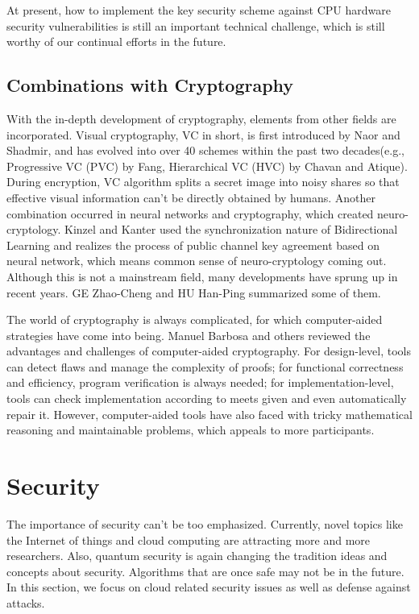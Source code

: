 \documentclass[conference]{IEEEtran}
\begin{document}
At present, how to implement the key security scheme against CPU hardware security vulnerabilities is still an important technical challenge, which is still worthy of our continual efforts in the future.

\subsection{Combinations with Cryptography}
\par With the in-depth development of cryptography, elements from other fields are incorporated. Visual cryptography, VC in short, is first introduced by Naor and Shadmir\cite{wxr-1}, and has evolved into over 40 schemes within the past two decades(e.g., Progressive VC (PVC) by Fang\cite{wxr-2}, Hierarchical VC (HVC) by Chavan and Atique\cite{wxr-3}). During encryption, VC algorithm splits a secret image into noisy shares so that effective visual information can’t be directly obtained by humans. Another combination occurred in neural networks and cryptography, which created neuro-cryptology. Kinzel and Kanter\cite{wxr-4} used the synchronization nature of Bidirectional Learning and realizes the process of public channel key agreement based on neural network, which means common sense of neuro-cryptology coming out. Although this is not a mainstream field, many developments have sprung up in recent years. GE Zhao-Cheng and HU Han-Ping\cite{wxr-5} summarized some of them.
\par The world of cryptography is always complicated, for which computer-aided strategies have come into being. Manuel Barbosa and others\cite{wxr-6} reviewed the advantages and challenges of computer-aided cryptography. For design-level, tools can detect flaws and manage the complexity of proofs; for functional correctness and efficiency,  program verification is always needed; for implementation-level, tools can check implementation according to meets given and even automatically repair it. However, computer-aided tools have also faced with tricky mathematical reasoning and maintainable problems, which appeals to more participants.

\section{Security}
The importance of security can't be too emphasized. Currently, novel topics like the Internet of things and cloud computing are attracting more and more researchers. Also, quantum security is again changing the tradition ideas and concepts about security. Algorithms that are once safe may not be in the future. In this section, we focus on cloud related security issues as well as defense against attacks. 
\end{document}
